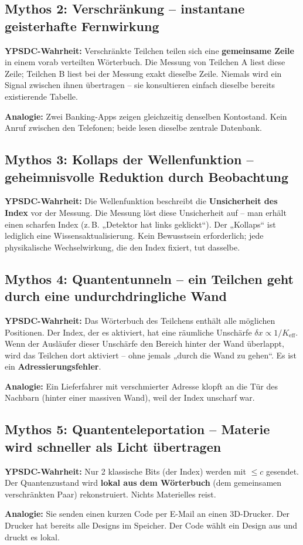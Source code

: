 \documentclass[12pt,a4paper]{article}
\begin{document}
	\subsection{Mythos 2: Verschränkung – instantane geisterhafte Fernwirkung}
	\textbf{YPSDC-Wahrheit:} Verschränkte Teilchen teilen sich eine \textbf{gemeinsame Zeile} in einem vorab verteilten Wörterbuch. Die Messung von Teilchen A liest diese Zeile; Teilchen B liest bei der Messung exakt dieselbe Zeile. Niemals wird ein Signal zwischen ihnen übertragen – sie konsultieren einfach dieselbe bereits existierende Tabelle.
	\par
	\textbf{Analogie:} Zwei Banking-Apps zeigen gleichzeitig denselben Kontostand. Kein Anruf zwischen den Telefonen; beide lesen dieselbe zentrale Datenbank.
	
	\subsection{Mythos 3: Kollaps der Wellenfunktion – geheimnisvolle Reduktion durch Beobachtung}
	\textbf{YPSDC-Wahrheit:} Die Wellenfunktion beschreibt die \textbf{Unsicherheit des Index} vor der Messung. Die Messung löst diese Unsicherheit auf – man erhält einen scharfen Index (z.\,B. „Detektor hat links geklickt“). Der „Kollaps“ ist lediglich eine Wissensaktualisierung. Kein Bewusstsein erforderlich; jede physikalische Wechselwirkung, die den Index fixiert, tut dasselbe.
	
	\subsection{Mythos 4: Quantentunneln – ein Teilchen geht durch eine undurchdringliche Wand}
	\textbf{YPSDC-Wahrheit:} Das Wörterbuch des Teilchens enthält alle möglichen Positionen. Der Index, der es aktiviert, hat eine räumliche Unschärfe \(\delta x \propto 1/K_{\mathrm{eff}}\). Wenn der Ausläufer dieser Unschärfe den Bereich hinter der Wand überlappt, wird das Teilchen dort aktiviert – ohne jemals „durch die Wand zu gehen“. Es ist ein \textbf{Adressierungsfehler}.
	\par
	\textbf{Analogie:} Ein Lieferfahrer mit verschmierter Adresse klopft an die Tür des Nachbarn (hinter einer massiven Wand), weil der Index unscharf war.
	
	\subsection{Mythos 5: Quantenteleportation – Materie wird schneller als Licht übertragen}
	\textbf{YPSDC-Wahrheit:} Nur 2 klassische Bits (der Index) werden mit \(\le c\) gesendet. Der Quantenzustand wird \textbf{lokal aus dem Wörterbuch} (dem gemeinsamen verschränkten Paar) rekonstruiert. Nichts Materielles reist.
	\par
	\textbf{Analogie:} Sie senden einen kurzen Code per E-Mail an einen 3D-Drucker. Der Drucker hat bereits alle Designs im Speicher. Der Code wählt ein Design aus und druckt es lokal.
	
\end{document}
